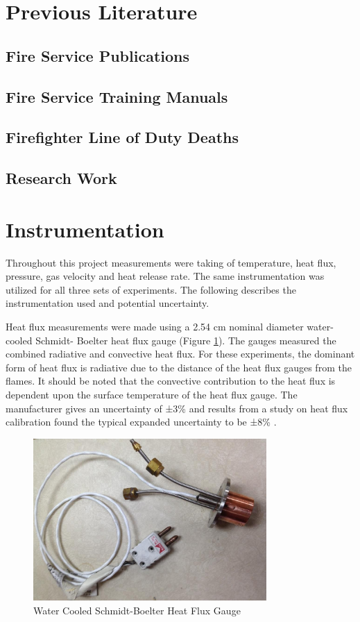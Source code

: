 \documentclass{article}
\begin{document}
\clearpage

\section{Previous Literature}
\subsection{Fire Service Publications}
\subsection{Fire Service Training Manuals}
\subsection{Firefighter Line of Duty Deaths}
\subsection{Research Work}

\clearpage

\section{Instrumentation}
Throughout this project measurements were taking of temperature, heat flux, pressure, gas velocity and heat release rate. The same instrumentation was utilized for all three sets of experiments. The following describes the instrumentation used and potential uncertainty.

Heat flux measurements were made using a 2.54 cm nominal diameter water-cooled Schmidt- Boelter heat flux gauge (Figure \ref{fig:HeatFluxGauge}). The gauges measured the combined radiative and convective heat flux. For these experiments, the dominant form of heat flux is radiative due to the distance of the heat flux gauges from the flames. It should be noted that the convective contribution to the heat flux is dependent upon the surface temperature of the heat flux gauge. The manufacturer gives an uncertainty of ±3\% and results from a study on heat flux calibration found the typical expanded uncertainty to be ±8\% \cite{HeatFluxRoundRobin}.

\begin{figure} [H]
	\centering
	\includegraphics[width = 3.5in]{0_Images/Instrumentation/Heat_Flux_Gauge.jpg}
	\caption{Water Cooled Schmidt-Boelter Heat Flux Gauge}
	\label{fig:HeatFluxGauge}
\end{figure}
\end{document}
